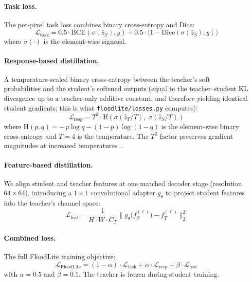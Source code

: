 \paragraph{Task loss.} The per-pixel task loss combines binary cross-entropy and Dice:
\begin{equation}
\mathcal{L}_{\mathrm{task}} = 0.5 \cdot \mathrm{BCE}(\sigma(\hat{z}_S), y) + 0.5 \cdot \bigl(1 - \mathrm{Dice}(\sigma(\hat{z}_S), y)\bigr)
\label{eq:task}
\end{equation}
where $\sigma(\cdot)$ is the element-wise sigmoid.

\paragraph{Response-based distillation.} A temperature-scaled binary cross-entropy between the teacher's soft probabilities and the student's softened outputs (equal to the teacher--student KL divergence up to a teacher-only additive constant, and therefore yielding identical student gradients; this is what \texttt{floodlite/losses.py} computes):
\begin{equation}
\mathcal{L}_{\mathrm{resp}} = T^{2} \cdot \mathrm{H}\!\left(\sigma(\hat{z}_T / T),\;\sigma(\hat{z}_S / T)\right)
\label{eq:resp}
\end{equation}
where $\mathrm{H}(p,q) = -\,p\log q - (1-p)\log(1-q)$ is the element-wise binary cross-entropy and $T=4$ is the temperature. The $T^{2}$ factor preserves gradient magnitudes at increased temperatures~\cite{hinton2015distilling}.

\paragraph{Feature-based distillation.} We align student and teacher features at one matched decoder stage (resolution $64{\times}64$), introducing a $1{\times}1$ convolutional adapter $g_\theta$ to project student features into the teacher's channel space:
\begin{equation}
\mathcal{L}_{\mathrm{feat}} = \frac{1}{H \cdot W \cdot C_T} \bigl\| g_\theta\bigl(f_S^{(\ell)}\bigr) - f_T^{(\ell)} \bigr\|_{2}^{2}
\label{eq:feat}
\end{equation}

\paragraph{Combined loss.} The full FloodLite training objective:
\begin{equation}
\mathcal{L}_{\mathrm{FloodLite}} = (1 - \alpha) \cdot \mathcal{L}_{\mathrm{task}} + \alpha \cdot \mathcal{L}_{\mathrm{resp}} + \beta \cdot \mathcal{L}_{\mathrm{feat}}
\label{eq:combined}
\end{equation}
with $\alpha=0.5$ and $\beta=0.1$. The teacher is frozen during student training.

